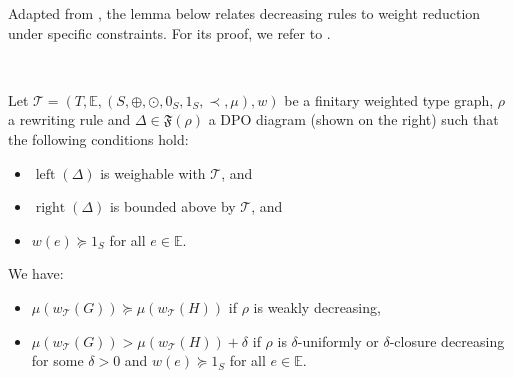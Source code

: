 Adapted from \cite[Theorem C.3]{endrullis2024generalized_arxiv_v2}, the lemma below relates decreasing rules to weight reduction under specific constraints. 
For its proof, we refer to \cite[Theorem 36]{qiu2025termination_nwf_v2_acceptedgcm}.
\begin{lemma}
    \label{lem:decreasing_step}
\ \newline
\begin{minipage}{0.7\textwidth}
    Let $\mathcal{T} = (T,\mathbb{E}, (S, \oplus, \odot, 0_S, 1_S, \prec, \mu), w)$ be a finitary weighted type graph, $\rho$ a rewriting rule and $\Delta \in \mathfrak{F}(\rho)$ a DPO diagram
    (shown on the right)   such that the following conditions hold:
\end{minipage}  
\begin{minipage}{0.3\textwidth}
    \begin{center}
      \end{center}
\end{minipage}
   \begin{itemize}
       \item $\operatorname{left}(\Delta)$ is weighable with \(\mathcal{T}\), and
       \item $\operatorname{right}(\Delta)$ is bounded above by \(\mathcal{T}\), and
       \item $w(e) \succeq 1_S$ for all $e \in \mathbb{E}$.
   \end{itemize}

   \noindent
  We have:
   \begin{itemize}
       \item $\mu(w_\mathcal{T}(G)) \succeq \mu(w_\mathcal{T}(H))$ if $\rho$ is weakly decreasing,
       \item $\mu(w_\mathcal{T}(G)) > \mu(w_\mathcal{T}(H)) + \delta$ if $\rho$ is $\delta$-uniformly or $\delta$-closure decreasing for some $\delta >0$ and $w(e) \succeq 1_S$ for all $e \in \mathbb{E}$.
   \end{itemize}
\end{lemma} 

